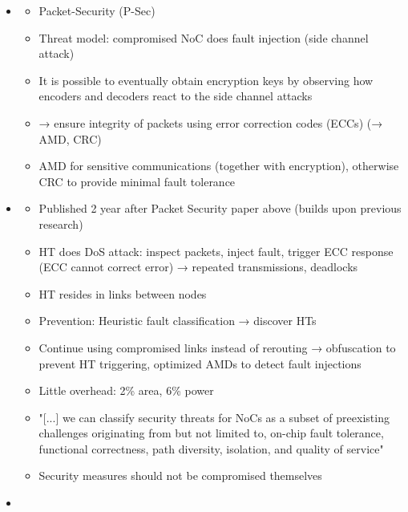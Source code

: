 \documentclass[
	paper=a4,
	fontsize=11pt,
	parskip=full %
]{scrreprt}
\begin{document}
\begin{itemize}
        \item \textbf{}
            \begin{itemize}
                \item Packet-Security (P-Sec)
                \item Threat model: compromised NoC does fault injection (side channel attack)
                \item It is possible to eventually obtain encryption keys by observing how encoders and decoders react to the side channel attacks
                \item → ensure integrity of packets using error correction codes (ECCs) (→ AMD, CRC)
                \item AMD for sensitive communications (together with encryption), otherwise CRC to provide minimal fault tolerance
            \end{itemize}
        \item \textbf{}
            \begin{itemize}
                \item Published 2 year after Packet Security paper above (builds upon previous research)
                \item HT does DoS attack: inspect packets, inject fault, trigger ECC response (ECC cannot correct error) → repeated transmissions,
                    deadlocks
                \item HT resides in links between nodes
                \item Prevention: Heuristic fault classification → discover HTs
                \item Continue using compromised links instead of rerouting → obfuscation to prevent HT triggering, optimized AMDs to detect fault
                    injections
                \item Little overhead: 2\% area, 6\% power
                \item "[...] we can classify security threats for NoCs as a subset of preexisting challenges originating from but not limited to,
                    on-chip fault tolerance, functional correctness, path diversity, isolation, and quality of service"
                \item Security measures should not be compromised themselves
            \end{itemize}
        \item \textbf{}

\end{itemize}
\end{document}
